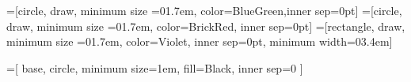 \makeatletter
\DeclareRobustCommand{\cvdots}{%
  \vbox{
    \baselineskip3.7\p@\lineskiplimit\z@
    \kern-\p@
    \hbox{.}\hbox{.}\hbox{.}
  }}
\makeatother

\DeclareMathOperator{\sign}{sign}

    =[circle,    draw, minimum size =01.7em,  color=BlueGreen,inner sep=0pt]
    =[circle,    draw, minimum size =01.7em,  color=BrickRed, inner sep=0pt]
    =[rectangle, draw, minimum size =01.7em,  color=Violet,   inner sep=0pt,
                                         minimum width=03.4em]  

\usetikzlibrary{
  arrows.meta,      %
  shapes.geometric, %
  chains,           %
  calc,             %
}
\usepackage{tikz-flowchart}
=[
  base,
  circle,
  minimum size=1em,
  fill=Black,
  inner sep=0
]

